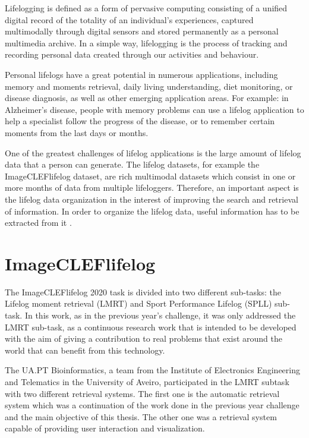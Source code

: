 Lifelogging is defined as a form of pervasive computing consisting of a unified digital record of the totality of an individual’s experiences, captured multimodally through digital sensors and stored permanently as a personal multimedia archive. In a simple way, lifelogging is the process of tracking and recording personal data created through our activities and behaviour.

Personal lifelogs have a great potential in numerous applications, including memory and moments retrieval, daily living understanding, diet monitoring, or disease diagnosis, as well as other emerging application areas. For example: in Alzheimer’s disease, people with memory problems can use a lifelog application to help a specialist follow the progress of the disease, or to remember certain moments from the last days or months.

One of the greatest challenges of lifelog applications is the large amount of lifelog data that a person can generate. The lifelog datasets, for example the ImageCLEFlifelog dataset, are rich multimodal datasets which consist in one or more months of data from multiple lifeloggers. Therefore, an important aspect is the lifelog data organization in the interest of improving the search and retrieval of information. In order to organize the lifelog data, useful information has to be extracted from it \cite{Ribeiro2019} \cite{Ribeiro2020}.

\newpage
\section{ImageCLEFlifelog}

\label{sec:imagecleflifelog}


The ImageCLEFlifelog 2020 task is divided into two different sub-tasks: the Lifelog moment retrieval (LMRT) and Sport Performance Lifelog (SPLL) sub-task. In this work, as in the previous year’s challenge, it was only addressed the LMRT sub-task, as a continuous research work that is intended to be developed with the aim of giving a contribution to real problems that exist around the world that can benefit from this technology.
    
The UA.PT Bioinformatics, a team from the Institute of Electronics Engineering and Telematics in the University of Aveiro, participated in the LMRT subtask with two different retrieval systems. The first one is the automatic retrieval system which was a continuation of the work done in the previous year challenge \cite{Ribeiro2019} and the main objective of this thesis. The other one was a retrieval system capable of providing user interaction and visualization. 

